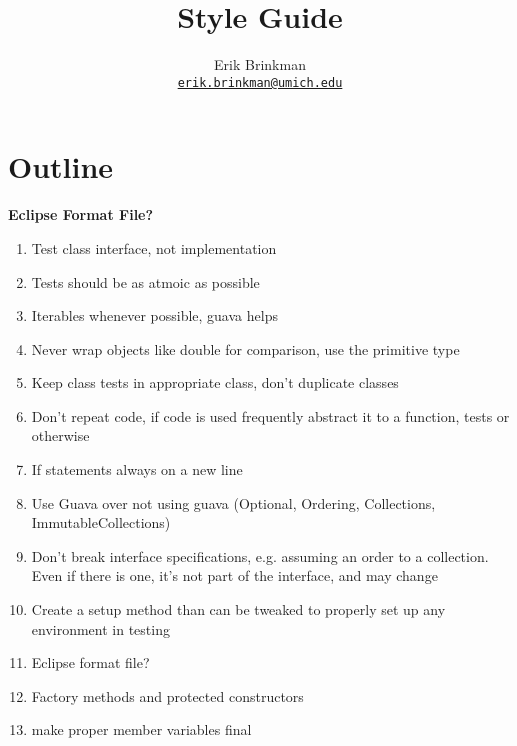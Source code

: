 \documentclass{article}
\newcommand{\email}[1]{\href{mailto:#1}{\texttt{#1}}}
\begin{document}
\title{Style Guide}
\author{Erik Brinkman \\ \email{erik.brinkman@umich.edu}}
\maketitle

\section{Outline}

\textbf{Eclipse Format File?}

\begin{enumerate}
\item Test class interface, not implementation
\item Tests should be as atmoic as possible
\item Iterables whenever possible, guava helps
\item Never wrap objects like double for comparison, use the primitive type
\item Keep class tests in appropriate class, don't duplicate classes
\item Don't repeat code, if code is used frequently abstract it to a function,
  tests or otherwise
\item If statements always on a new line
\item Use Guava over not using guava (Optional, Ordering, Collections,
  ImmutableCollections)
\item Don't break interface specifications, e.g. assuming an order to a
  collection. Even if there is one, it's not part of the interface, and may
  change
\item Create a setup method than can be tweaked to properly set up any
  environment in testing
\item Eclipse format file?
\item Factory methods and protected constructors
\item make proper member variables final
\end{enumerate}
\end{document}
